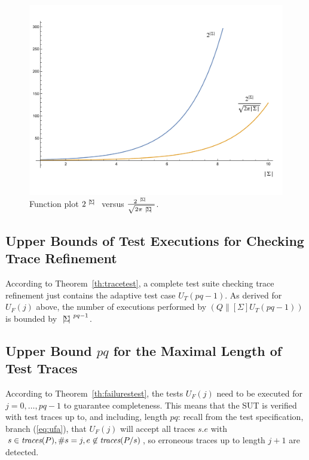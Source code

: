  \begin{figure}
 \begin{center}
\includegraphics[width=.8\textwidth]{minhit-fig.pdf}
\end{center}
\vspace*{-10mm}
\caption{Function plot $2^{{~|\! \Sigma\!|~}}$ versus $\frac{2^{~|\! \Sigma\!|~}}{\sqrt{2\pi {~|\! \Sigma\!|~}}}$.}
 \label{fig:minhita}
 \end{figure}

\subsection{Upper Bounds of Test Executions for Checking Trace Refinement}

According to Theorem~\ref{th:tracetest}, a complete test suite checking trace
refinement just contains the adaptive test case $U_T(pq-1)$. As derived for
$U_F(j)$ above, the number of executions performed by $(Q\parallel[\Sigma]
U_T(pq-1))$ is bounded by ${~|\! \Sigma\!|~}^{pq-1}$.

\subsection{Upper Bound $pq$ for the Maximal Length of Test Traces}

According to Theorem~\ref{th:failurestest}, the tests $U_F(j)$ need to be
executed for $j = 0,\dots,pq-1$ to guarantee completeness.
 This means that the SUT is verified with test
traces up to, and including, length $pq$: recall from the test specification,
branch (\ref{eq:ufa}), that $U_F(j)$ will accept all traces $s.e$ with
$s\in\text{\it traces}(P), \#s = j, e\not\in\text{\it traces}(P/s)$, so erroneous traces up to length
$j+1$ are detected.

